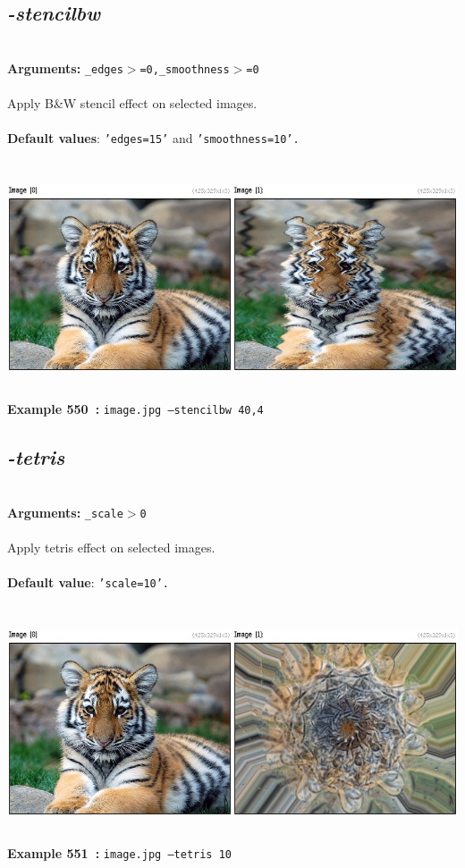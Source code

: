 \documentclass[a4paper,11pt,twoside]{book}
\begin{document}
\subsection{\emph{-stencilbw} }\vspace*{-0.5em}
~\\\textbf{Arguments: } 
{\small \texttt{\_edges$>$=0,\_smoothness$>$=0}}\\~\\
Apply B\&W stencil effect on selected images.
~\\~\\\textbf{Default values}: {\small \texttt{'edges=15'} and \texttt{'smoothness=10'.}}
\begin{center}\includegraphics[keepaspectratio=true,height=7cm,width=\textwidth]{img/gmic_def550.jpg}\\
{\footnotesize \textbf{Example 550~:} \texttt{image.jpg --stencilbw 40,4}}
\end{center}

\subsection{\emph{-tetris} }\vspace*{-0.5em}
~\\\textbf{Arguments: } 
{\small \texttt{\_scale$>$0}}\\~\\
Apply tetris effect on selected images.
~\\~\\\textbf{Default value}: {\small \texttt{'scale=10'.}}
\begin{center}\includegraphics[keepaspectratio=true,height=7cm,width=\textwidth]{img/gmic_def551.jpg}\\
{\footnotesize \textbf{Example 551~:} \texttt{image.jpg --tetris 10}}
\end{center}
\end{document}
